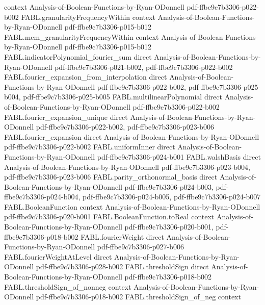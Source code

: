 \begin{theorem}
  {context}
  {Analysis-of-Boolean-Functions-by-Ryan-ODonnell}
  {pdf-ffbe9c7b3306-p022-b002}
\proofstep
  {FABL.granularityFrequencyWithin}
  {context}
  {Analysis-of-Boolean-Functions-by-Ryan-ODonnell}
  {pdf-ffbe9c7b3306-p015-b012}
\proofstep
  {FABL.mem_granularityFrequencyWithin}
  {context}
  {Analysis-of-Boolean-Functions-by-Ryan-ODonnell}
  {pdf-ffbe9c7b3306-p015-b012}
\proofstep
  {FABL.indicatorPolynomial_fourier_sum}
  {direct}
  {Analysis-of-Boolean-Functions-by-Ryan-ODonnell}
  {pdf-ffbe9c7b3306-p021-b002,
    pdf-ffbe9c7b3306-p022-b002}
\proofstep
  {FABL.fourier_expansion_from_interpolation}
  {direct}
  {Analysis-of-Boolean-Functions-by-Ryan-ODonnell}
  {pdf-ffbe9c7b3306-p022-b002,
    pdf-ffbe9c7b3306-p025-b004,
    pdf-ffbe9c7b3306-p025-b005}
\proofstep
  {FABL.multilinearPolynomial}
  {direct}
  {Analysis-of-Boolean-Functions-by-Ryan-ODonnell}
  {pdf-ffbe9c7b3306-p022-b002}
\proofstep
  {FABL.fourier_expansion_unique}
  {direct}
  {Analysis-of-Boolean-Functions-by-Ryan-ODonnell}
  {pdf-ffbe9c7b3306-p022-b002,
    pdf-ffbe9c7b3306-p023-b006}
\proofstep
  {FABL.fourier_expansion}
  {direct}
  {Analysis-of-Boolean-Functions-by-Ryan-ODonnell}
  {pdf-ffbe9c7b3306-p022-b002}
\proofstep
  {FABL.uniformInner}
  {direct}
  {Analysis-of-Boolean-Functions-by-Ryan-ODonnell}
  {pdf-ffbe9c7b3306-p024-b001}
\proofstep
  {FABL.walshBasis}
  {direct}
  {Analysis-of-Boolean-Functions-by-Ryan-ODonnell}
  {pdf-ffbe9c7b3306-p023-b004,
    pdf-ffbe9c7b3306-p023-b006}
\proofstep
  {FABL.parity_orthonormal_basis}
  {direct}
  {Analysis-of-Boolean-Functions-by-Ryan-ODonnell}
  {pdf-ffbe9c7b3306-p024-b003,
    pdf-ffbe9c7b3306-p024-b004,
    pdf-ffbe9c7b3306-p024-b005,
    pdf-ffbe9c7b3306-p024-b007}
\proofstep
  {FABL.BooleanFunction}
  {context}
  {Analysis-of-Boolean-Functions-by-Ryan-ODonnell}
  {pdf-ffbe9c7b3306-p020-b001}
\proofstep
  {FABL.BooleanFunction.toReal}
  {context}
  {Analysis-of-Boolean-Functions-by-Ryan-ODonnell}
  {pdf-ffbe9c7b3306-p020-b001,
    pdf-ffbe9c7b3306-p018-b002}
\proofstep
  {FABL.fourierWeight}
  {direct}
  {Analysis-of-Boolean-Functions-by-Ryan-ODonnell}
  {pdf-ffbe9c7b3306-p027-b006}
\proofstep
  {FABL.fourierWeightAtLevel}
  {direct}
  {Analysis-of-Boolean-Functions-by-Ryan-ODonnell}
  {pdf-ffbe9c7b3306-p028-b002}
\proofstep
  {FABL.thresholdSign}
  {direct}
  {Analysis-of-Boolean-Functions-by-Ryan-ODonnell}
  {pdf-ffbe9c7b3306-p018-b002}
\proofstep
  {FABL.thresholdSign_of_nonneg}
  {context}
  {Analysis-of-Boolean-Functions-by-Ryan-ODonnell}
  {pdf-ffbe9c7b3306-p018-b002}
\proofstep
  {FABL.thresholdSign_of_neg}
  {context}

\end{theorem}
